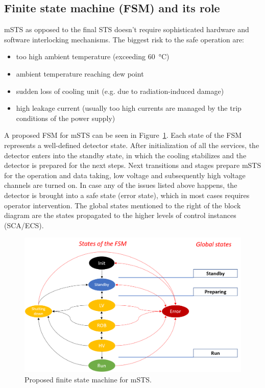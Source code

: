 \subsection{Finite state machine (FSM) and its role}
\gls{mSTS} as opposed to the final \gls{STS} doesn't require sophisticated hardware and software interlocking mechanisms. The biggest risk to the safe operation are:
\begin{itemize}
    \item too high ambient temperature (exceeding \SI{60}{\degreeCelsius})
    \item ambient temperature reaching dew point 
    \item sudden loss of cooling unit (e.g. due to radiation-induced damage)
    \item high leakage current (usually too high currents are managed by the trip conditions of the power supply)
\end{itemize}
A proposed \gls{FSM} for \gls{mSTS} can be seen in Figure~\ref{fig_FSM}. Each state of the \gls{FSM} represents a well-defined detector state. After initialization of all the services, the detector enters into the standby state, in which the cooling stabilizes and the detector is prepared for the next steps. Next transitions and stages prepare \gls{mSTS} for the operation and data taking, low voltage and subsequently high voltage channels are turned on. In case any of the issues listed above happens, the detector is brought into a safe state (error state), which in most cases requires operator intervention. The global states mentioned to the right of the block diagram are the states propagated to the higher levels of control instances (\gls{SCA}/\gls{ECS}).
\begin{figure}[h!]
\centering
\includegraphics[width=1\columnwidth]{Chapter6/DCS/images/FSM.png}
\caption{Proposed finite state machine for \gls{mSTS}. }
\label{fig_FSM}
\end{figure}

